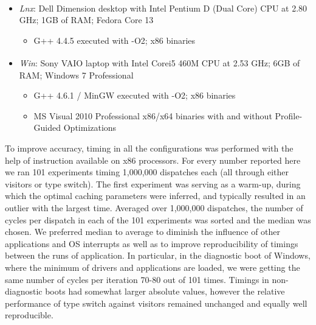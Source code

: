 \begin{itemize}
\setlength{\itemsep}{0pt}
\setlength{\parskip}{0pt}
\item \emph{Lnx}: Dell Dimension\textsuperscript{\textregistered} desktop with Intel\textsuperscript{\textregistered} Pentium\textsuperscript{\textregistered} 
      D (Dual Core) CPU at 2.80 GHz; 1GB of RAM; Fedora Core 13  
      \begin{itemize}
      \setlength{\itemsep}{0pt}
      \setlength{\parskip}{0pt}
      \item G++ 4.4.5 executed with -O2; x86 binaries
      \end{itemize}
\item \emph{Win}: Sony VAIO\textsuperscript{\textregistered} laptop with Intel\textsuperscript{\textregistered} Core\texttrademark i5 460M 
      CPU at 2.53 GHz; 6GB of RAM; Windows 7 Professional
      \begin{itemize}
      \setlength{\itemsep}{0pt}
      \setlength{\parskip}{0pt}
      \item G++ 4.6.1 / MinGW executed with -O2; x86 binaries
      \item MS Visual \Cpp{} 2010 Professional x86/x64 binaries with and without 
      Profile-Guided Optimizations
      \end{itemize}
\end{itemize}

\noindent
To improve accuracy, timing in all the configurations was performed with the 
help of  instruction available on x86 processors. For every number reported 
here we ran 101 experiments timing 1,000,000 dispatches each (all through either 
visitors or type switch). The first experiment was serving as a warm-up, during 
which the optimal caching parameters were inferred, and typically resulted in an 
outlier with the largest time. Averaged over 1,000,000 dispatches, the number of 
cycles per dispatch in each of the 101 experiments was sorted and the median was 
chosen. We preferred median to average to diminish the influence of other 
applications and OS interrupts as well as to improve reproducibility of timings 
between the runs of application. In particular, in the diagnostic boot of 
Windows, where the minimum of drivers and applications are loaded, we were 
getting the same number of cycles per iteration 70-80 out of 101 times. Timings 
in non-diagnostic boots had somewhat larger absolute values, however the 
relative performance of type switch against visitors remained unchanged and 
equally well reproducible.

